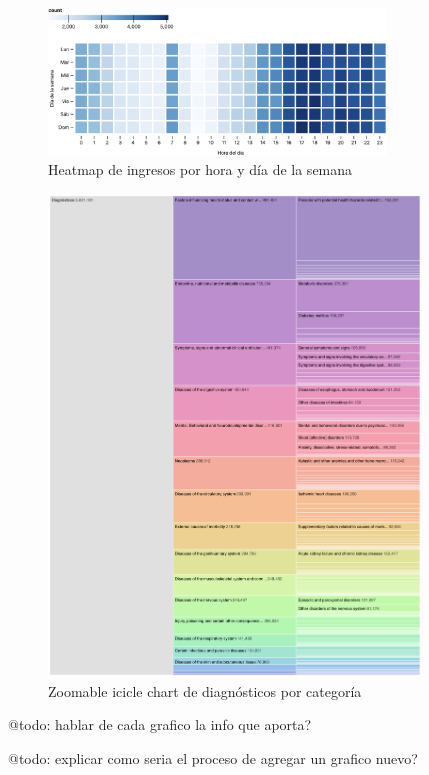 \begin{figure}[H]
  \centering
  \includegraphics[width=0.8\textwidth]{imagenes/chart4.png}
  \caption{Heatmap de ingresos por hora y día de la semana}
  \label{fig:chart4}
\end{figure}


\begin{figure}[H]
  \centering
  \includegraphics[width=0.88\textwidth]{imagenes/chart5.png}
  \caption{Zoomable icicle chart de diagnósticos por categoría}
  \label{fig:chart5}
\end{figure}

@todo: hablar de cada grafico la info que aporta?

@todo: explicar como seria el proceso de agregar un grafico nuevo?

